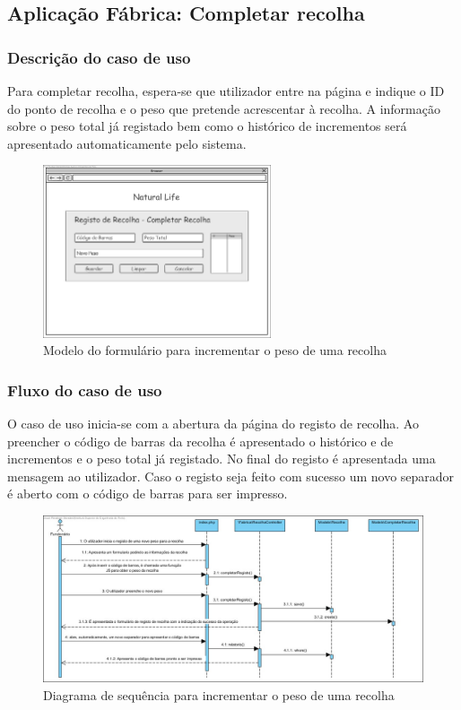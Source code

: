 \subsection{Aplicação Fábrica: Completar recolha}
\subsubsection*{Descrição do caso de uso}
Para completar recolha, espera-se que utilizador entre na página e indique o ID do ponto de recolha e o peso que pretende acrescentar à recolha. A informação sobre o peso total já registado bem como o histórico de incrementos será apresentado automaticamente pelo sistema. 

\begin{figure}[H] 
	\begin{center}
		\includegraphics[width=0.60\textwidth,keepaspectratio]{figuras/Diagramas_vp/DI_Fabrica_7_Completa_Recolha.jpg}
		\caption{Modelo do formulário para incrementar o peso de uma recolha}
		\label{fig:di_completar_recolha} 
	\end{center}
\end{figure}

\subsubsection*{Fluxo do caso de uso}
O caso de uso inicia-se com a abertura da página do registo de recolha. Ao preencher o código de barras da recolha é apresentado o histórico e de incrementos e o peso total já registado. No final do registo é apresentada uma mensagem ao utilizador. Caso o registo seja feito com sucesso um novo separador é aberto com o código de barras para ser impresso.


\begin{figure}[H] 
	\begin{center}
		\includegraphics[width=\textwidth,keepaspectratio]{figuras/Diagramas_vp/SD_Fabrica_7_Completar_Recolha.jpg}
		\caption{Diagrama de sequência para incrementar o peso de uma recolha}
		\label{fig:sd_completar_recolha} 
	\end{center}
\end{figure}